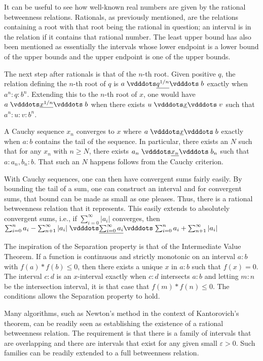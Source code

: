 \documentclass[12pt]{article}
\begin{document}
It can be useful to see how well-known real numbers are given by the rational betweenness relations. Rationals, as previously mentioned, are the relations containing a root with that root being the rational in question; an interval is in the relation if it contains that rational number. The least upper bound has also been mentioned as essentially the intervals whose lower endpoint is a lower bound of the upper bounds and the upper endpoint is one of the upper bounds. 

The next step after rationals is that of the $n$-th root. Given positive $q$, the relation defining the $n$-th root of $q$ is $a \xrel[q^{1/n}] b$ exactly when $a^n: q: b^n$. Extending this to the $n$-th root of $x$, one would have $a \xrel[x^{1/n}] b$ when there exists $u \xrel v$ such that $a^n:u:v:b^n$.

A Cauchy sequence $x_n$ converges to $x$ where $a \xrel b$ exactly when $a:b$ contains the tail of the sequence. In particular, there exists an $N$ such that for any $x_n$ with $n \geq N$, there exists $a_n \xrel[x_n] b_n$ such that $a:{a_n, b_n}:b$. That such an $N$ happens follows from the Cauchy criterion.  

With Cauchy sequences, one can then have convergent sums fairly easily. By bounding the tail of a sum, one can construct an interval and for convergent sums, that bound can be made as small as one pleases. Thus, there is a rational betweenness relation that it represents. This easily extends to absolutely convergent sums, i.e., if $ \sum_{i=0}^{\infty} |a_i|$ converges, then $\sum_{i=0}^n a_i - \sum_{n+1}^{\infty} |a_i| \xrel[\sum_{i=0}^{\infty} a_i] \sum_{i=0}^n a_i + \sum_{n+1}^{\infty} |a_i|$ 

The inspiration of the Separation property is that of the Intermediate Value Theorem. If a function is continuous and strictly monotonic on an interval $a:b$ with $f(a)*f(b) \leq 0$, then there exists a unique $x$ in $a:b$ such that $f(x) = 0$. The interval $c:d$ is an $x$-interval exactly when $c:d$ intersects $a:b$ and letting $m:n$ be the intersection interval, it is that case that $f(m)*f(n) \leq 0$. The conditions allows the Separation property to hold. 

Many algorithms, such as Newton's method in the context of Kantorovich's theorem, can be readily seen as establishing the existence of a rational betweenness relation. The requirement is that there is a family of intervals that are overlapping and there are intervals that exist for any given small $\varepsilon>0$. Such families can be readily extended to a full betweenness relation. 
\end{document}
